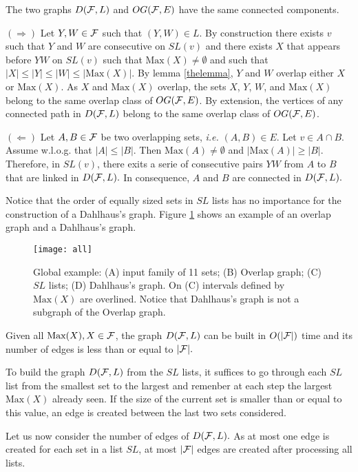 \documentclass{llncs}
\begin{document}
\begin{lemma}
The two graphs $D({\cal F},L)$ and $OG({\cal F},E)$ have the same
connected components.
\label{samecomponent}
\end{lemma}
\begin{preuve}
$(\Rightarrow)$ Let $Y,W \in {\cal F}$ such that $(Y,W) \in
L.$ By construction there exists $v$ such that $Y$ and $W$ are
consecutive on $SL(v)$ and there exists $X$ that appears before
$YW$ on $SL(v)$ such that $\mbox{Max}(X)\not=\emptyset$ and such that
$|X|\leq |Y| \leq |W| \leq |\mbox{Max}(X)|.$ By lemma \ref{thelemma},
$Y$ and $W$ overlap either $X$ or $\mbox{Max}(X).$ As $X$ and
$\mbox{Max}(X)$ overlap, the sets $X$, $Y$, $W$, and $\mbox{Max}(X)$ belong to
the same overlap class of $OG({\cal F},E)$. By extension, the vertices
of any connected path in $D({\cal F},L)$ belong to the same overlap
class of $OG({\cal F},E)$. 

\noindent
$(\Leftarrow)$ Let $A, B \in {\cal F}$ be two overlapping sets, {\em
  i.e. } $(A,B) \in E.$ Let $v \in A \cap B.$ Assume w.l.o.g. that
  $|A|\leq |B|.$ Then $\mbox{Max}(A)\not=\emptyset$ and $|\mbox{Max}(A)|
  \geq |B|.$ Therefore, in $SL(v)$, there exits a serie of consecutive
  pairs $YW$ from $A$ to $B$ that are linked in $D({\cal F},L).$ In
  consequence, $A$ and $B$ are connected in $D({\cal F},L).$
\end{preuve}


Notice that the order of equally sized sets in $SL$ lists has no
importance for the construction of a Dahlhaus's graph. Figure
\ref{allexample} shows an example of an overlap graph and a Dahlhaus's
graph.



\begin{figure}[htb]
\vspace{-0.3cm}
  \centering
\texttt{[image: all]}
\caption{Global example: (A) input family of 11 sets; (B) Overlap graph; (C) $SL$ lists; (D) Dahlhaus's graph. On (C) intervals defined by $\mbox{Max}(X)$ are overlined. Notice that Dahlhaus's graph is not a subgraph of the Overlap graph.}
 \label{allexample}
\vspace{-0.3cm}
\end{figure}

\begin{lemma}
Given all $\mbox{Max}(X), X \in {\cal F}$, the graph $D({\cal F},L)$
can be built in $O(|{\cal F}|)$ time and its number of edges is less
than or equal to $|{\cal F}|.$
\end{lemma}
\begin{preuve}
To build the graph $D({\cal F},L)$ from the $SL$ lists, it suffices to
go through each $SL$ list from the smallest set to the largest and
remenber at each step the largest $\mbox{Max}(X)$ already seen. If the size
of the current set is smaller than or equal to this value, an edge is
created between the last two sets considered.
  
Let us now consider the number of edges of $D({\cal F},L).$ As at most
one edge is created for each set in a list $SL$, at most $|{\cal F}|$
edges are created after processing all lists.
\end{preuve}
\end{document}
